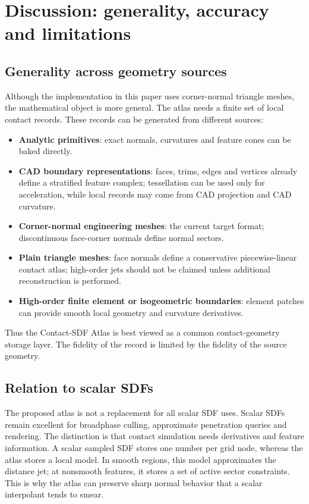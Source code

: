 \documentclass[preprint,12pt,sort&compress]{elsarticle}
\begin{document}
\section{Discussion: generality, accuracy and limitations}
\label{sec:discussion}

\subsection{Generality across geometry sources}

Although the implementation in this paper uses corner-normal triangle meshes, the mathematical object is more general. The atlas needs a finite set of local contact records. These records can be generated from different sources:
\begin{itemize}[leftmargin=1.6em]
\item \textbf{Analytic primitives}: exact normals, curvatures and feature cones can be baked directly.
\item \textbf{CAD boundary representations}: faces, trims, edges and vertices already define a stratified feature complex; tessellation can be used only for acceleration, while local records may come from CAD projection and CAD curvature.
\item \textbf{Corner-normal engineering meshes}: the current target format; discontinuous face-corner normals define normal sectors.
\item \textbf{Plain triangle meshes}: face normals define a conservative piecewise-linear contact atlas; high-order jets should not be claimed unless additional reconstruction is performed.
\item \textbf{High-order finite element or isogeometric boundaries}: element patches can provide smooth local geometry and curvature derivatives.
\end{itemize}
Thus the Contact-SDF Atlas is best viewed as a common contact-geometry storage layer. The fidelity of the record is limited by the fidelity of the source geometry.

\subsection{Relation to scalar SDFs}

The proposed atlas is not a replacement for all scalar SDF uses. Scalar SDFs remain excellent for broadphase culling, approximate penetration queries and rendering. The distinction is that contact simulation needs derivatives and feature information. A scalar sampled SDF stores one number per grid node, whereas the atlas stores a local model. In smooth regions, this model approximates the distance jet; at nonsmooth features, it stores a set of active sector constraints. This is why the atlas can preserve sharp normal behavior that a scalar interpolant tends to smear.
\end{document}

